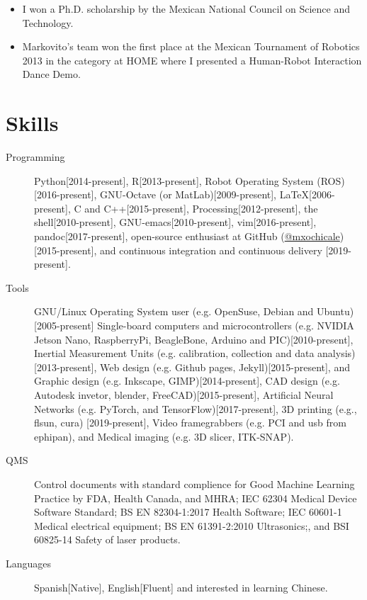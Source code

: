\documentclass{mycv}
\begin{document}
\begin{itemize}
\item I won a Ph.D. scholarship by the Mexican National Council on Science and Technology. 

\item Markovito's team  won the first place at the Mexican Tournament of Robotics 2013 in the category at HOME where I presented a Human-Robot Interaction Dance Demo. \href{https://www.youtube.com/watch?v=Kw-lZam_qZI}{\faYoutube} 

\end{itemize}

\section{Skills}
\begin{description}

\item[Programming] Python[2014-present],
R[2013-present], 
Robot Operating System (ROS)[2016-present],
GNU-Octave (or MatLab)[2009-present],
\LaTeX [2006-present], 
C and C++[2015-present],
Processing[2012-present], 
the shell[2010-present], 
GNU-emacs[2010-present],
vim[2016-present], 
pandoc[2017-present],
open-source enthusiast at GitHub (\href{https://github.com/mxochicale}{@mxochicale})[2015-present], 
and continuous integration and continuous delivery [2019-present]. 

\item[Tools] 
GNU/Linux Operating System user (e.g. OpenSuse, Debian and Ubuntu)[2005-present]
Single-board computers and microcontrollers (e.g. 
NVIDIA Jetson Nano, RaspberryPi, BeagleBone, Arduino and PIC)[2010-present],
Inertial Measurement Units (e.g. calibration, collection and data analysis)[2013-present], 
Web design (e.g. Github pages, Jekyll)[2015-present], and
Graphic design (e.g. Inkscape, GIMP)[2014-present],
CAD design (e.g. Autodesk invetor, blender, FreeCAD)[2015-present], 
Artificial Neural Networks (e.g. PyTorch, and TensorFlow)[2017-present], 
3D printing (e.g., flsun, cura) [2019-present], 
Video framegrabbers (e.g. PCI and usb from ephipan), and 
Medical imaging (e.g. 3D slicer, ITK-SNAP).

\item[QMS] 
Control documents with standard complience for
Good Machine Learning Practice by FDA, Health Canada, and MHRA;
IEC 62304 Medical Device Software Standard;
BS EN 82304-1:2017 Health Software;
IEC 60601-1 Medical electrical equipment; 
BS EN 61391-2:2010 Ultrasonics;, and
BSI 60825-14 Safety of laser products.

\item[Languages] Spanish[Native], English[Fluent] and interested in learning Chinese.
 
\end{description}
\end{document}
